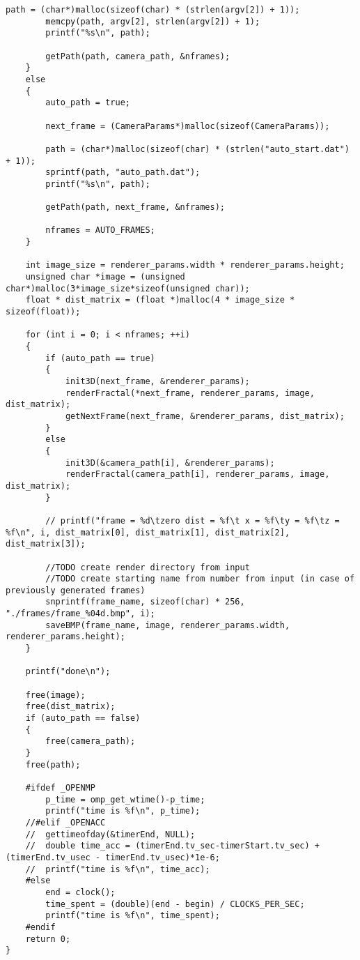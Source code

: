 \documentclass[]{article}
\begin{document}
\begin{Verbatim}[fontsize= \footnotesize, tabsize=4]
		path = (char*)malloc(sizeof(char) * (strlen(argv[2]) + 1));
		memcpy(path, argv[2], strlen(argv[2]) + 1);
		printf("%s\n", path);

		getPath(path, camera_path, &nframes);
	}
	else
	{
		auto_path = true;

		next_frame = (CameraParams*)malloc(sizeof(CameraParams));

		path = (char*)malloc(sizeof(char) * (strlen("auto_start.dat") + 1));
		sprintf(path, "auto_path.dat");
		printf("%s\n", path);

		getPath(path, next_frame, &nframes);

		nframes = AUTO_FRAMES;
	}

	int image_size = renderer_params.width * renderer_params.height;
	unsigned char *image = (unsigned char*)malloc(3*image_size*sizeof(unsigned char));
	float * dist_matrix = (float *)malloc(4 * image_size * sizeof(float));

	for (int i = 0; i < nframes; ++i)
	{
		if (auto_path == true)
		{
			init3D(next_frame, &renderer_params);
			renderFractal(*next_frame, renderer_params, image, dist_matrix);
			getNextFrame(next_frame, &renderer_params, dist_matrix);
		}
		else
		{
			init3D(&camera_path[i], &renderer_params);
			renderFractal(camera_path[i], renderer_params, image, dist_matrix);
		}

		// printf("frame = %d\tzero dist = %f\t x = %f\ty = %f\tz = %f\n", i, dist_matrix[0], dist_matrix[1], dist_matrix[2], dist_matrix[3]);

		//TODO create render directory from input
		//TODO create starting name from number from input (in case of previously generated frames)
		snprintf(frame_name, sizeof(char) * 256, "./frames/frame_%04d.bmp", i);
		saveBMP(frame_name, image, renderer_params.width, renderer_params.height);
	}

	printf("done\n");

	free(image);
	free(dist_matrix);
	if (auto_path == false)
	{
		free(camera_path);
	}
	free(path);

	#ifdef _OPENMP
		p_time = omp_get_wtime()-p_time;
		printf("time is %f\n", p_time);
	//#elif _OPENACC
	//	gettimeofday(&timerEnd, NULL);
	//	double time_acc = (timerEnd.tv_sec-timerStart.tv_sec) + (timerEnd.tv_usec - timerEnd.tv_usec)*1e-6;
	//	printf("time is %f\n", time_acc);
	#else
		end = clock();
		time_spent = (double)(end - begin) / CLOCKS_PER_SEC;
		printf("time is %f\n", time_spent);
	#endif
	return 0;
}
\end{Verbatim}
\end{document}
